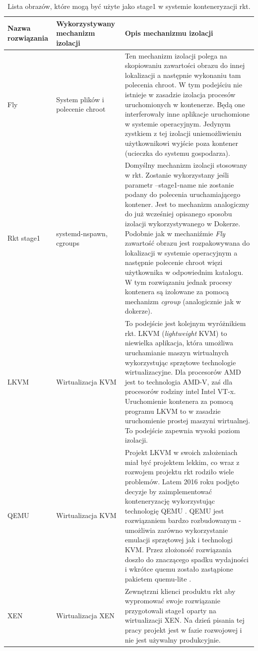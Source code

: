 \documentclass[10pt,a4paper,titlepage,twoside]{report}
\begin{document}
\begin{table}[!htbp]
\caption{Lista obrazów, które mogą być użyte jako stage1 w systemie konteneryzacji rkt. \cite{ad30}}
\label{rkt_flavors}
\centering
\begin{tabular}{|p{3cm}|p{3cm}|p{8cm}|}
  \hline
  \textbf{Nazwa rozwiązania} & \textbf{Wykorzystywany mechanizm izolacji} & \textbf{Opis mechanizmu izolacji}\\
  \hline
  Fly & System plików i polecenie chroot & Ten mechanizm izolacji polega na skopiowaniu zawartości obrazu do innej lokalizacji a następnie wykonaniu tam polecenia chroot. W tym podejściu nie istnieje w zasadzie izolacja procesów uruchomionych w kontenerze. Będą one interferowały inne aplikacje uruchomione w systemie operacyjnym. Jedynym zystkiem z tej izolacji uniemożliwieniu użytkownikowi wyjście poza kontener (ucieczka do systemu gospodarza). \\
  \hline
  Rkt stage1 & systemd-nspawn, cgroups & Domyślny mechanizm izolacji stosowany w rkt. Zostanie wykorzystany jeśli parametr --stage1-name nie zostanie podany do polecenia uruchamiającego kontener. Jest to mechanizm analogiczny do już wcześniej opisanego sposobu izolacji wykorzystywanego w Dokerze. Podobnie jak w mechaniźmie \textit{Fly} zawartość obrazu jest rozpakowywana do lokalizacji w systemie operacyjnym a następnie polecenie chroot więzi użytkownika w odpowiednim katalogu. W tym rozwiązaniu jednak procesy kontenera są izolowane za pomocą mechanizm \textit{cgroup} (analogicznie jak w dokerze). \\
  \hline
  LKVM & Wirtualizacja KVM & To podejście jest kolejnym wyróżnikiem rkt. LKVM (\textit{lightweight} KVM) to niewielka aplikacja, która umożliwa uruchamianie maszyn wirtualnych wykorzystując sprzętowe technologie wirtualizacyjne. Dla procesorów AMD jest to technologia AMD-V, zaś dla procesorów rodziny intel Intel VT-x. Uruchomienie kontenera za pomocą programu LKVM to w zasadzie uruchomienie prostej maszyni wirtualnej. To podejście zapewnia wysoki poziom izolacji. \\
  \hline
  QEMU & Wirtualizacja KVM & Projekt LKVM w swoich założeniach miał być projektem lekkim, co wraz z rozwojem projektu rkt rodziło wiele problemów. Latem 2016 roku podjęto decyzje by zaimplementować konteneryzację wykorzystując technologię QEMU \cite{ad31}. QEMU jest rozwiązaniem bardzo rozbudowanym - umożliwia zarówno wykorzystanie emulacji sprzętowej jak i technologi KVM. Przez złożoność rozwiązania doszło do znaczącego spadku wydajności i wkrótce quemu zostało zastąpione pakietem quemu-lite \cite{ad32}. \\
  \hline
  XEN & Wirtualizacja XEN & Zewnętrzni klienci produktu rkt aby wypromować swoje rozwiązanie przygotowali stage1 oparty na wirtualizacji XEN. Na dzień pisania tej pracy projekt jest w fazie rozwojowej i nie jest używalny produkcyjnie. \\
  \hline
\end{tabular}
\end{table}
\end{document}
